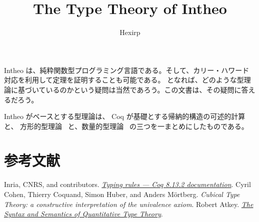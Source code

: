 \documentclass[book=true]{jlreq}
\title{The Type Theory of Intheo}
\author{Hexirp}
\begin{document}
\frontmatter

\maketitle

Intheo は、純粋関数型プログラミング言語である。そして、カリー・ハワード対応を利用して定理を証明することも可能である。
となれば、どのような型理論に基づいているのかという疑問は当然であろう。この文書は、その疑問に答えるだろう。

Intheo がベースとする型理論は、 Coq が基礎とする帰納的構造の可述的計算~\cite{cic} と、
方形的型理論~\cite{cutt} と、数量的型理論~\cite{qtt} の三つを一まとめにしたものである。

\tableofcontents

\mainmatter

\part{参考文献}

\begin{thebibliography}
    Inria, CNRS, and contributors.
    \href{https://coq.github.io/doc/v8.13/refman/language/cic.html}{\textit{Typing rules --- Coq 8.13.2 documentation}}.
    Cyril Cohen, Thierry Coquand, Simon Huber, and Anders Mörtberg.
    \textit{Cubical Type Theory: a constructive interpretation of the univalence axiom}.
    Robert Atkey.
    \href{https://bentnib.org/quantitative-type-theory.html}{\textit{The Syntax and Semantics of Quantitative Type Theory}}.
\end{thebibliography}

\backmatter

\makeindex
\end{document}
